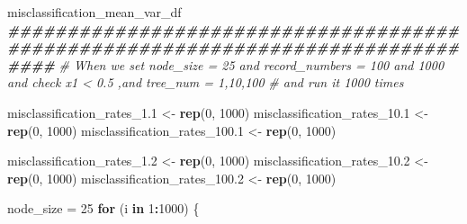 \documentclass[
]{article}
\newenvironment{Shaded}{\begin{snugshade}}{\end{snugshade}}
\newcommand{\CommentTok}[1]{\textcolor[rgb]{0.56,0.35,0.01}{\textit{#1}}}
\newcommand{\ControlFlowTok}[1]{\textcolor[rgb]{0.13,0.29,0.53}{\textbf{#1}}}
\newcommand{\DecValTok}[1]{\textcolor[rgb]{0.00,0.00,0.81}{#1}}
\newcommand{\DocumentationTok}[1]{\textcolor[rgb]{0.56,0.35,0.01}{\textbf{\textit{#1}}}}
\newcommand{\FloatTok}[1]{\textcolor[rgb]{0.00,0.00,0.81}{#1}}
\newcommand{\FunctionTok}[1]{\textcolor[rgb]{0.13,0.29,0.53}{\textbf{#1}}}
\newcommand{\NormalTok}[1]{#1}
\newcommand{\OtherTok}[1]{\textcolor[rgb]{0.56,0.35,0.01}{#1}}
\newcommand{\SpecialCharTok}[1]{\textcolor[rgb]{0.81,0.36,0.00}{\textbf{#1}}}
\begin{document}
\begin{Shaded}
\begin{Highlighting}[]
\NormalTok{misclassification\_mean\_var\_df}
\DocumentationTok{\#\#\#\#\#\#\#\#\#\#\#\#\#\#\#\#\#\#\#\#\#\#\#\#\#\#\#\#\#\#\#\#\#\#\#\#\#\#\#\#\#\#\#\#\#\#\#\#\#\#\#\#\#\#\#\#\#\#\#\#\#\#\#\#\#\#\#\#\#\#\#\#\#\#\#\#\#\#\#\#}
\CommentTok{\# When we set node\_size = 25 and record\_numbers = 100 and 1000 and check x1 \textless{} 0.5 ,and tree\_num = 1,10,100}
\CommentTok{\# and run it 1000 times}

\NormalTok{misclassification\_rates\_1}\FloatTok{.1} \OtherTok{\textless{}{-}} \FunctionTok{rep}\NormalTok{(}\DecValTok{0}\NormalTok{, }\DecValTok{1000}\NormalTok{)}
\NormalTok{misclassification\_rates\_10}\FloatTok{.1} \OtherTok{\textless{}{-}} \FunctionTok{rep}\NormalTok{(}\DecValTok{0}\NormalTok{, }\DecValTok{1000}\NormalTok{)}
\NormalTok{misclassification\_rates\_100}\FloatTok{.1} \OtherTok{\textless{}{-}} \FunctionTok{rep}\NormalTok{(}\DecValTok{0}\NormalTok{, }\DecValTok{1000}\NormalTok{)}

\NormalTok{misclassification\_rates\_1}\FloatTok{.2} \OtherTok{\textless{}{-}} \FunctionTok{rep}\NormalTok{(}\DecValTok{0}\NormalTok{, }\DecValTok{1000}\NormalTok{)}
\NormalTok{misclassification\_rates\_10}\FloatTok{.2} \OtherTok{\textless{}{-}} \FunctionTok{rep}\NormalTok{(}\DecValTok{0}\NormalTok{, }\DecValTok{1000}\NormalTok{)}
\NormalTok{misclassification\_rates\_100}\FloatTok{.2} \OtherTok{\textless{}{-}} \FunctionTok{rep}\NormalTok{(}\DecValTok{0}\NormalTok{, }\DecValTok{1000}\NormalTok{)}

\NormalTok{node\_size }\OtherTok{=} \DecValTok{25}
\ControlFlowTok{for}\NormalTok{ (i }\ControlFlowTok{in} \DecValTok{1}\SpecialCharTok{:}\DecValTok{1000}\NormalTok{) \{}


\end{Highlighting}
\end{Shaded}
\end{document}
